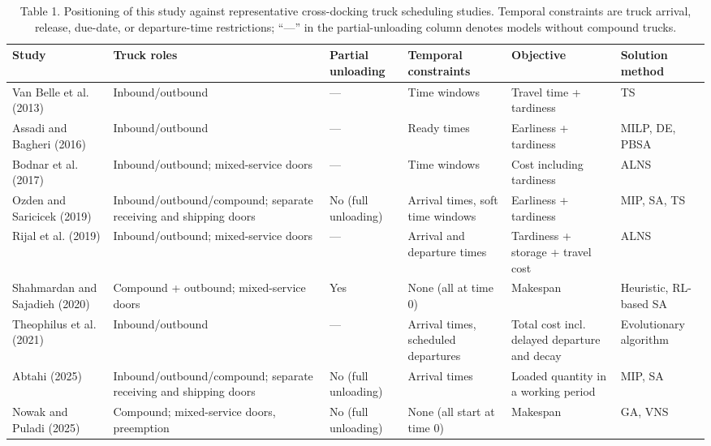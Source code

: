 \documentclass[10pt,a4paper]{article}
\begin{document}
\begin{table}[tbp]\centering
\caption{Table 1. Positioning of this study against representative cross-docking truck scheduling studies. Temporal constraints are truck arrival, release, due-date, or departure-time restrictions; ``---'' in the partial-unloading column denotes models without compound trucks.}
\label{tab:pos}\footnotesize\setlength{\tabcolsep}{4pt}
\begin{tabular}{@{}>{\raggedright\arraybackslash}p{}>{\raggedright\arraybackslash}p{}>{\raggedright\arraybackslash}p{}>{\raggedright\arraybackslash}p{}>{\raggedright\arraybackslash}p{}>{\raggedright\arraybackslash}p{}@{}}
\toprule
Study & Truck roles & Partial unloading & Temporal constraints & Objective & Solution method\\
\midrule
Van Belle et al. (2013) & Inbound\slash outbound & --- & Time windows & Travel time + tardiness & TS\\
Assadi and Bagheri (2016) & Inbound\slash outbound & --- & Ready times & Earliness + tardiness & MILP, DE, PBSA\\
Bodnar et al. (2017) & Inbound\slash outbound; mixed-service doors & --- & Time windows & Cost including tardiness & ALNS\\
Ozden and Saricicek (2019) & Inbound\slash outbound\slash compound; separate receiving and shipping doors & No (full unloading) & Arrival times, soft time windows & Earliness + tardiness & MIP, SA, TS\\
Rijal et al. (2019) & Inbound\slash outbound; mixed-service doors & --- & Arrival and departure times & Tardiness + storage + travel cost & ALNS\\
Shahmardan and Sajadieh (2020) & Compound + outbound; mixed-service doors & Yes & None (all at time 0) & Makespan & Heuristic, RL-based SA\\
Theophilus et al. (2021) & Inbound\slash outbound & --- & Arrival times, scheduled departures & Total cost incl. delayed departure and decay & Evolutionary algorithm\\
Abtahi (2025) & Inbound\slash outbound\slash compound; separate receiving and shipping doors & No (full unloading) & Arrival times & Loaded quantity in a working period & MIP, SA\\
Nowak and Puladi (2025) & Compound; mixed-service doors, preemption & No (full unloading) & None (all start at time 0) & Makespan & GA, VNS\\

\end{tabular}
\end{table}
\end{document}
